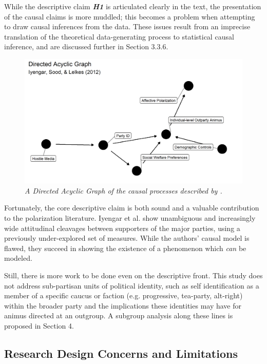 \documentclass[12pt]{article}
\begin{document}
While the descriptive claim \textbf{\textit{H1}} is articulated clearly in the text, the presentation of the causal claims is more muddled; this becomes a problem when attempting to draw causal inferences from the data. These issues result from an imprecise translation of the theoretical data-generating process to statistical causal inference, and are discussed further in Section 3.3.6.

\begin{figure}[h!]
\center\includegraphics[width=6in]{ext-dag.png}
\caption{\label{fig:dag}\textit{A Directed Acyclic Graph of the causal processes described by \citeauthor{iyengar2012affect}.}}
\end{figure}

Fortunately, the core descriptive claim is both sound and a valuable contribution to the polarization literature. Iyengar et al. show unambiguous and increasingly wide attitudinal cleavages between supporters of the major parties, using a previously under-explored set of measures. While the authors' causal model is flawed, they succeed in showing the existence of a phenomenon which \textit{can} be modeled.

Still, there is more work to be done even on the descriptive front. This study does not address sub-partisan units of political identity, such as self identification as a member of a specific caucus or faction (e.g. progressive, tea-party, alt-right) within the broader party and the implications these identities may have for animus directed at an outgroup. A subgroup analysis along these lines is proposed in Section 4.



\subsection{Research Design Concerns and Limitations}
\end{document}
